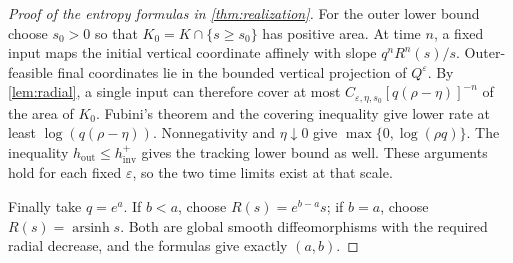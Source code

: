 \documentclass[11pt,a4paper]{article}
\theoremstyle{remark}
\newcommand{\hout}{h_{\mathrm{out}}}
\newcommand{\htrack}{h_{\mathrm{inv}}^+}
\begin{document}
\begin{proof}[Proof of the entropy formulas in \cref{thm:realization}]
For the outer lower bound choose $s_0>0$ so that
$K_0=K\cap\{s\geq s_0\}$ has positive area. At time $n$, a fixed input
maps the initial vertical coordinate affinely with slope
$q^nR^n(s)/s$. Outer-feasible final coordinates lie in the bounded vertical
projection of $Q^\varepsilon$. By \cref{lem:radial}, a single input can
therefore cover at most
$C_{\varepsilon,\eta,s_0}[q(\rho-\eta)]^{-n}$ of the area of $K_0$.
Fubini's theorem and the covering inequality give lower rate at least
$\log(q(\rho-\eta))$. Nonnegativity and $\eta\downarrow0$ give
$\max\{0,\log(\rho q)\}$. The inequality $\hout\leq\htrack$ gives the
tracking lower bound as well. These arguments hold for each fixed
$\varepsilon$, so the two time limits exist at that scale.

Finally take $q=e^a$. If $b<a$, choose $R(s)=e^{b-a}s$; if $b=a$, choose
$R(s)=\operatorname{arsinh}s$. Both are global smooth diffeomorphisms with
the required radial decrease, and the formulas give exactly $(a,b)$.
\end{proof}
\end{document}
